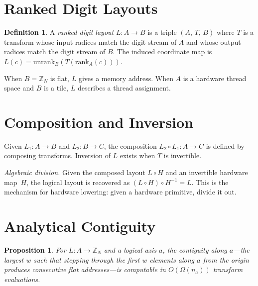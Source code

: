\documentclass[11pt]{article}
\newtheorem{proposition}[theorem]{Proposition}
\theoremstyle{definition}
\newtheorem{definition}[theorem]{Definition}
\theoremstyle{remark}
\newcommand{\Z}{\mathbb{Z}}
\newcommand{\rank}{\mathrm{rank}}
\newcommand{\unrank}{\mathrm{unrank}}
\begin{document}
\section{Ranked Digit Layouts}

\begin{definition}
A \emph{ranked digit layout} $L: A \to B$ is a triple $(A,\,T,\,B)$ where $T$ is a transform whose input radices match the digit stream of $A$ and whose output radices match the digit stream of $B$.
The induced coordinate map is
$L(c) = \unrank_B(T(\rank_A(c)))$.
\end{definition}

When $B = \Z_N$ is flat, $L$ gives a memory address.
When $A$ is a hardware thread space and $B$ is a tile, $L$ describes a thread assignment.

\section{Composition and Inversion}

Given $L_1: A \to B$ and $L_2: B \to C$, the composition $L_2 \circ L_1: A \to C$ is defined by composing transforms.
Inversion of $L$ exists when $T$ is invertible.

\emph{Algebraic division.}
Given the composed layout $L \circ H$ and an invertible hardware map~$H$, the logical layout is recovered as $(L \circ H) \circ H^{-1} = L$.
This is the mechanism for hardware lowering: given a hardware primitive, divide it out.

\section{Analytical Contiguity}

\begin{proposition}
For $L: A \to \Z_N$ and a logical axis $a$, the contiguity along $a$---the largest $w$ such that stepping through the first $w$ elements along $a$ from the origin produces consecutive flat addresses---is computable in $O(\Omega(n_a))$ transform evaluations.
\end{proposition}
\end{document}

